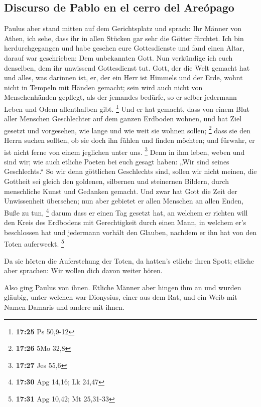 \hypertarget{discurso-de-pablo-en-el-cerro-del-areuxf3pago}{%
\subsection{Discurso de Pablo en el cerro del
Areópago}\label{discurso-de-pablo-en-el-cerro-del-areuxf3pago}}

 Paulus aber stand mitten auf dem Gerichtsplatz und
sprach: Ihr Männer von Athen, ich sehe, dass ihr in allen Stücken gar
sehr die Götter fürchtet.  Ich bin herdurchgegangen und
habe gesehen eure Gottesdienste und fand einen Altar, darauf war
geschrieben: Dem unbekannten Gott. Nun verkündige ich euch denselben,
dem ihr unwissend Gottesdienst tut.  Gott, der die Welt
gemacht hat und alles, was darinnen ist, er, der ein Herr ist Himmels
und der Erde, wohnt nicht in Tempeln mit Händen gemacht; 
sein wird auch nicht von Menschenhänden gepflegt, als der jemandes
bedürfe, so er selber jedermann Leben und Odem allenthalben gibt.
\footnote{\textbf{17:25} Ps 50,9-12}  Und er hat gemacht,
dass von einem Blut aller Menschen Geschlechter auf dem ganzen Erdboden
wohnen, und hat Ziel gesetzt und vorgesehen, wie lange und wie weit sie
wohnen sollen; \footnote{\textbf{17:26} 5Mo 32,8}  dass
sie den Herrn suchen sollten, ob sie doch ihn fühlen und finden möchten;
und fürwahr, er ist nicht ferne von einem jeglichen unter uns.
\footnote{\textbf{17:27} Jes 55,6}  Denn in ihm leben,
weben und sind wir; wie auch etliche Poeten bei euch gesagt haben: „Wir
sind seines Geschlechts.``  So wir denn göttlichen
Geschlechts sind, sollen wir nicht meinen, die Gottheit sei gleich den
goldenen, silbernen und steinernen Bildern, durch menschliche Kunst und
Gedanken gemacht.  Und zwar hat Gott die Zeit der
Unwissenheit übersehen; nun aber gebietet er allen Menschen an allen
Enden, Buße zu tun, \footnote{\textbf{17:30} Apg 14,16; Lk 24,47}
 darum dass er einen Tag gesetzt hat, an welchem er
richten will den Kreis des Erdbodens mit Gerechtigkeit durch einen Mann,
in welchem er's beschlossen hat und jedermann vorhält den Glauben,
nachdem er ihn hat von den Toten auferweckt. \footnote{\textbf{17:31}
  Apg 10,42; Mt 25,31-33}

 Da sie hörten die Auferstehung der Toten, da hatten's
etliche ihren Spott; etliche aber sprachen: Wir wollen dich davon weiter
hören.

 Also ging Paulus von ihnen.  Etliche
Männer aber hingen ihm an und wurden gläubig, unter welchen war
Dionysius, einer aus dem Rat, und ein Weib mit Namen Damaris und andere
mit ihnen.

